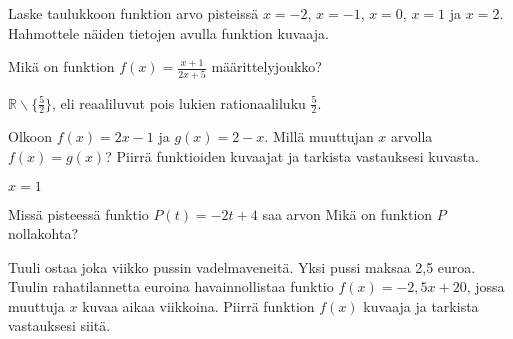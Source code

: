 \begin{tehtavasivu}
\begin{tehtava}
\end{tehtava}

\begin{tehtava}
  Laske taulukkoon funktion arvo pisteissä $x=-2$, $x=-1$, $x=0$, $x=1$ ja $x=2$. Hahmottele näiden tietojen avulla funktion kuvaaja.

  \begin{vastaus}
  \end{vastaus}
\end{tehtava}

\begin{tehtava} %
  Mikä on funktion $f(x)=\frac{x+1}{2x+5}$ määrittelyjoukko?

  \begin{vastaus}
   $\mathbb{R} \backslash \lbrace \frac{5}{2} \rbrace$, eli reaaliluvut pois lukien rationaaliluku $\frac{5}{2}$.
  \end{vastaus}

\end{tehtava}

\begin{tehtava} %
	Olkoon $f(x) = 2x-1$ ja $g(x) = 2-x$. Millä muuttujan $x$ arvolla $f(x) = g(x)$? Piirrä funktioiden kuvaajat ja tarkista vastauksesi kuvasta.
    \begin{vastaus}
    $x=1$
    \end{vastaus}
\end{tehtava}

\begin{tehtava} %
	Missä pisteessä funktio $P(t)=-2t+4$ saa arvon
	 Mikä on funktion $P$ nollakohta?
	 \begin{vastaus}
	 \end{vastaus}
\end{tehtava}

\begin{tehtava} %
	Tuuli ostaa joka viikko pussin vadelmaveneitä. Yksi pussi maksaa 2,5 euroa. Tuulin rahatilannetta euroina havainnollistaa funktio $f(x) = -2,5x+20$, jossa muuttuja $x$ kuvaa aikaa viikkoina.
	Piirrä funktion $f(x)$ kuvaaja ja tarkista vastauksesi siitä.
	 

\end{tehtava}
\end{tehtavasivu}
